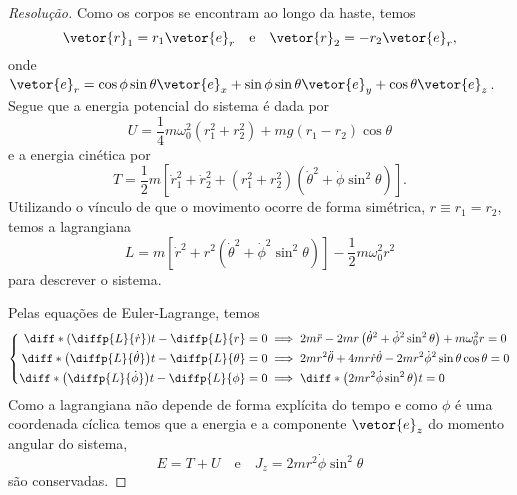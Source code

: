 \begin{proof}[Resolução]
    Como os corpos se encontram ao longo da haste, temos
    \begin{equation*}
        \vetor{r}_1 = r_1\vetor{e}_r\quad\text{e}\quad \vetor{r}_2 = - r_2 \vetor{e}_r,
    \end{equation*}
    onde \(\vetor{e}_r = \cos\phi\sin\theta \vetor{e}_x + \sin\phi\sin\theta \vetor{e}_y + \cos\theta \vetor{e}_z\). Segue que a energia potencial do sistema é dada por
    \begin{equation*}
        U = \frac14 m \omega_0^2\left(r_1^2 + r_2^2\right) + mg\left(r_1 - r_2\right)\cos\theta
    \end{equation*}
    e a energia cinética por
    \begin{equation*}
        T = \frac12 m\left[\dot{r}_1^2 + \dot{r}_2^2 + \left(r_1^2 + r_2^2\right)\left(\dot{\theta}^2 + \dot{\phi}\sin^2\theta\right)\right].
    \end{equation*}
    Utilizando o vínculo de que o movimento ocorre de forma simétrica, \(r \equiv r_1 = r_2\), temos a lagrangiana
    \begin{equation*}
        L = m\left[\dot{r}^2 + r^2\left(\dot{\theta}^2 + \dot{\phi}^2\sin^2\theta\right)\right] - \frac12 m \omega_0^2r^2
    \end{equation*}
    para descrever o sistema.

    Pelas equações de Euler-Lagrange, temos
    \begin{equation*}
        \left\{\begin{aligned}
                \diff*{\left(\diffp{L}{\dot{r}}\right)}{t} - \diffp{L}{r} = 0 &\implies 2m\ddot{r} - 2mr\left(\dot{\theta}^2 + \dot\phi^2\sin^2\theta\right) + m\omega_0^2 r = 0\\
                \diff*{\left(\diffp{L}{\dot{\theta}}\right)}{t} - \diffp{L}{\theta} = 0 &\implies 2mr^2\ddot{\theta} + 4mr\dot{r}\dot{\theta} - 2mr^2\dot\phi^2\sin\theta\cos\theta = 0\\
                \diff*{\left(\diffp{L}{\dot{\phi}}\right)}{t} - \diffp{L}{\phi} = 0 &\implies \diff*{\left(2mr^2\dot\phi\sin^2\theta\right)}{t} = 0
        \end{aligned}\right.
    \end{equation*}
    Como a lagrangiana não depende de forma explícita do tempo e como \(\phi\) é uma coordenada cíclica temos que a energia e a componente \(\vetor{e}_z\) do momento angular do sistema,
    \begin{equation*}
        E = T + U\quad\text{e}\quad J_z = 2mr^2\dot\phi\sin^2\theta
    \end{equation*}
    são conservadas.
\end{proof}
